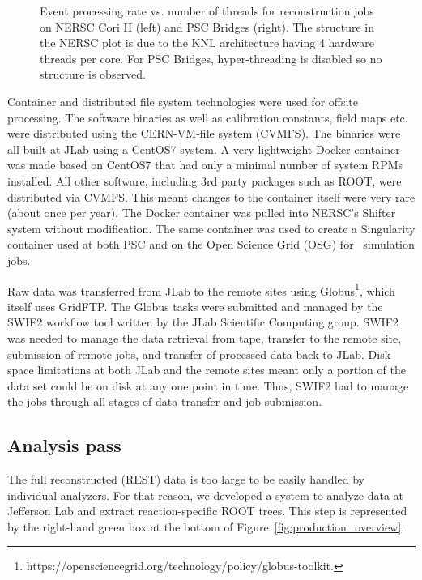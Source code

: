 \begin{figure}[h!]\centering
\caption[]{\label{fig:production_offsite_rate_vs_nthreads_NERSC}Event processing rate vs. number of threads for reconstruction jobs on NERSC Cori II (left) and PSC Bridges (right). The structure in the NERSC plot is due to the KNL architecture having 4 hardware threads per core. For PSC Bridges, hyper-threading is disabled so no structure is observed.} 
\end{figure}

Container and distributed file system technologies were used for offsite processing. The software binaries as well as calibration constants, field maps etc. were distributed using the CERN-VM-file system (CVMFS). The binaries were all built at JLab using a CentOS7 system. A very lightweight Docker container was made based on CentOS7 that had only a minimal number of system RPMs installed. All other software, including 3rd party packages such as ROOT, were distributed via CVMFS. This meant changes to the container itself were very rare (about once per year). The Docker container was pulled into NERSC's Shifter system without modification. The same container was used to create a Singularity container used at both PSC and on the Open Science Grid (OSG) for \GX~simulation jobs.

Raw data was transferred from JLab to the remote sites using Globus\footnote{https://opensciencegrid.org/technology/policy/globus-toolkit.},  which itself uses GridFTP. The Globus tasks were submitted and managed by the SWIF2 workflow tool written by the JLab Scientific Computing group. SWIF2 was needed to manage the data retrieval from tape, transfer to the remote site, submission of remote jobs, and transfer of processed data back to JLab. Disk space limitations at both JLab and the remote sites meant only a portion of the data set could be on disk at any one point in time. Thus, SWIF2 had to manage the jobs through all stages of data transfer and job submission.

\subsection{Analysis pass \label{sec:recanalysis}}

The full reconstructed (REST) data is too large to be easily handled by individual analyzers. For that reason, we developed a system to analyze data at Jefferson Lab and extract reaction-specific ROOT trees. This step is represented by the right-hand green box at the bottom of Figure~\ref{fig:production_overview}.

